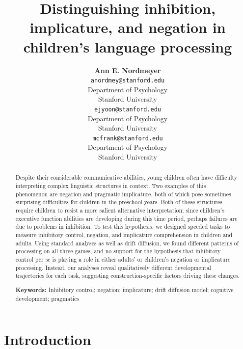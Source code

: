 \documentclass[10pt,letterpaper]{article}
\title{Distinguishing inhibition, implicature, and negation in children's language processing}
\author{{\large \bf Ann E. Nordmeyer} \\
 \texttt{anordmey@stanford.edu} \\
 Department of Psychology \\
 Stanford University
 \And {\large \bf Erica J. Yoon} \\
 \texttt{ejyoon@stanford.edu} \\
 Department of Psychology \\
 Stanford University
 \And {\large \bf Michael C. Frank} \\
 \texttt{mcfrank@stanford.edu} \\
 Department of Psychology \\
 Stanford University}
\newcommand{\ejy}[1]{\textcolor{Blue}{[ejy: #1]}}
\newcommand{\aen}[1]{\textcolor{DarkOrange}{[aen: #1]}}
\begin{document}
\maketitle


\begin{abstract}

Despite their considerable communicative abilities, young children often have difficulty interpreting complex linguistic structures in context. Two examples of this phenomenon are negation and pragmatic implicature, both of which pose sometimes surprising difficulties for children in the preschool years. Both of these structures require children to resist a more salient alternative interpretation; since children's executive function abilities are developing during this time period, perhaps failures are due to problems in inhibition. To test this hypothesis, we designed speeded tasks to measure inhibitory control, negation, and implicature comprehension in children and adults. Using standard analyses as well as drift diffusion, we found different patterns of processing on all three games, and no support for the hypothesis that inhibitory control per se is playing a role in either adults' or children's negation or implicature processing. Instead, our analyses reveal qualitatively different developmental trajectories for each task, suggesting construction-specific factors driving these changes.

\textbf{Keywords:}
Inhibitory control; negation; implicature; drift diffusion model; cognitive development; pragmatics
\end{abstract}


\section{Introduction}

%
%
\end{document}
